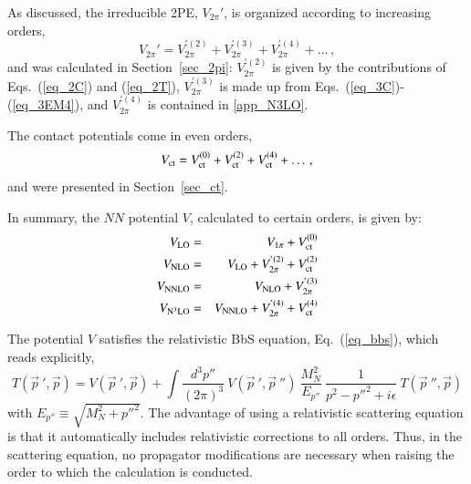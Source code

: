 \documentclass[sort&compress,preprint,3p]{elsarticle}
\begin{document}
As discussed, the irreducible 2PE, $V_{2\pi}'$, is organized
according to increasing orders,
\begin{equation}
V_{2\pi}' = 
V_{2\pi}^{'(2)} +
V_{2\pi}^{'(3)} +
V_{2\pi}^{'(4)} 
+ \ldots 
\,,
\end{equation}
and was calculated in Section~\ref{sec_2pi}:
$V_{2\pi}^{'(2)}$
is given by the contributions of
Eqs.~(\ref{eq_2C}) and (\ref{eq_2T}),
$V_{2\pi}^{'(3)}$
is made up from
Eqs.~(\ref{eq_3C})-(\ref{eq_3EM4}), and
$V_{2\pi}^{'(4)}$
is contained in \ref{app_N3LO}.

The contact potentials come in even orders,
\begin{equation}
V_{\rm ct} =
V_{\rm ct}^{(0)} + 
V_{\rm ct}^{(2)} + 
V_{\rm ct}^{(4)} 
+ \ldots
\,,
\end{equation}
and were presented in Section~\ref{sec_ct}.

In summary, the $NN$ potential $V$, calculated 
to certain orders,
is given by:
\begin{eqnarray}
V_{\rm LO} &=& V_{1\pi} + V_{\rm ct}^{(0)} 
\label{eq_Vlo} \\
V_{\rm NLO} &=& V_{\rm LO} + V_{2\pi}^{'(2)} + V_{\rm ct}^{(2)} 
\label{eq_Vnlo} \\
V_{\rm NNLO} &=& V_{\rm NLO} + V_{2\pi}^{'(3)} 
\label{eq_Vnnlo} \\
V_{{\rm N}^3{\rm LO}} &=&
 V_{\rm NNLO} + V_{2\pi}^{'(4)} + V_{\rm ct}^{(4)}
\label{eq_Vn3lo}
\end{eqnarray}

The potential $V$ satisfies the relativistic
BbS equation, Eq.~(\ref{eq_bbs}), which reads explicitly,
\begin{equation}
{T}({\vec p}~',{\vec p})= {V}({\vec p}~',{\vec p})+
\int \frac{d^3p''}{(2\pi)^3} \:
{V}({\vec p}~',{\vec p}~'') \:
\frac{M_N^2}{E_{p''}} \:  
\frac{1}
{{ p}^{2}-{p''}^{2}+i\epsilon} \:
{T}({\vec p}~'',{\vec p}) 
\label{eq_bbs2}
\end{equation}
with $E_{p''}\equiv \sqrt{M_N^2 + {p''}^2}$.
The advantage of using a relativistic scattering equation is that it automatically
includes relativistic corrections to all orders. Thus, in the scattering equation,
no propagator modifications are necessary when raising the order to which the
calculation is conducted.
\end{document}
